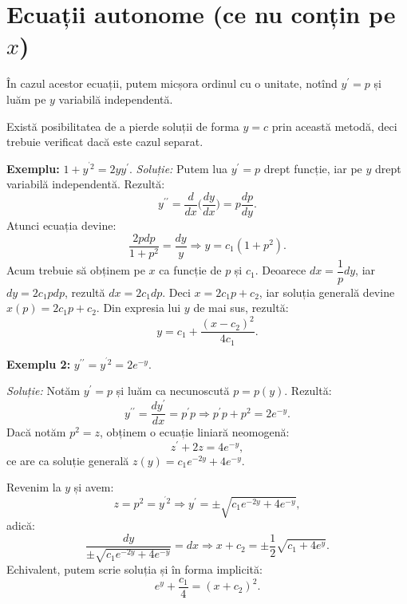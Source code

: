 
\section{Ecuații autonome (ce nu conțin pe $ x $)}

În cazul acestor ecuații, putem micșora ordinul cu o unitate, notînd
$ y^{\prime} = p $ și luăm pe $ y $ variabilă independentă.

\begin{remark}\label{rk:aut-const}
  Există posibilitatea de a pierde soluții de forma $ y = c $ prin această
  metodă, deci trebuie verificat dacă este cazul separat.
\end{remark}

\textbf{Exemplu:} $ 1 + y^{^{\prime}2} = 2yy^{\prime} $.
\emph{Soluție:} Putem lua $ y^{\prime} = p $ drept funcție, iar pe $ y $ drept
variabilă independentă. Rezultă:
\[
  y^{\prime\prime} = \dfrac{d}{dx} \Big( \dfrac{dy}{dx} \Big) = p \dfrac{dp}{dy}.
\]
Atunci ecuația devine:
\[
  \dfrac{2p dp}{1 + p^2} = \dfrac{dy}{y} \Rightarrow %
  y = c_1(1 + p^2).
\]
Acum trebuie să obținem pe $ x $ ca funcție de $ p $ și $ c_1 $.
Deoarece $ dx = \dfrac{1}{p} dy $, iar $ dy = 2c_1 pdp $, rezultă
$ dx = 2c_1 dp $. Deci $ x = 2c_1p + c_2 $, iar soluția generală devine
$ x(p) = 2c_1 p + c_2 $. Din expresia lui $ y $ de mai sus, rezultă:
\[
  y = c_1 + \dfrac{(x - c_2)^2}{4c_1}.
\]

\vspace{1cm}

\textbf{Exemplu 2:} $ y^{\prime\prime} = y^{^{\prime}2} = 2e^{-y} $.

\emph{Soluție:} Notăm $ y^{\prime} = p $ și luăm ca necunoscută $ p = p(y) $.
Rezultă:
\[
  y^{\prime\prime} = \dfrac{dy^{\prime}}{dx} = p^{\prime}p \Rightarrow p^{\prime}p + p^2 = 2e^{-y}.
\]
Dacă notăm $ p^2 = z $, obținem o ecuație liniară neomogenă:
\[
  z^{\prime} + 2z = 4e^{-y},
\]
ce are ca soluție generală $ z(y) = c_1 e^{-2y} + 4e^{-y} $.

Revenim la $ y $ și avem:
\[
  z = p^2 = y^{^{\prime}2} \Rightarrow y^{\prime} = \pm \sqrt{c_1 e^{-2y} + 4e^{-y}},
\]
adică:
\[
  \dfrac{dy}{\pm \sqrt{c_1 e^{-2y} + 4e^{-y}}} = dx \Rightarrow %
  x + c_2 = \pm \dfrac{1}{2} \sqrt{c_1 + 4e^y}.
\]
Echivalent, putem scrie soluția și în forma implicită:
\[
  e^y + \dfrac{c_1}{4} = (x + c_2)^2.
\]


